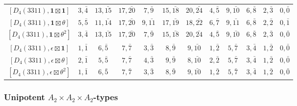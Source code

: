 \begin{table}[ht]
\begin{adjustbox}{max width=\linewidth}
\begin{tabular}{|c|ccccccccccc|}
        $[D_4(3311), \mathbf{1}\boxtimes\mathbf{1}]$ & $3, \bar{4}$ & $13, \bar{15}$ & $17, \bar{20}$ & $7, \bar{9}$ & $15, \bar{18}$ & $20, \bar{24}$ & $4, \bar{5}$ & $9, \bar{10}$ & $6, \bar{8}$ & $2, \bar{3}$ & $0, \bar{0}$ \\ 
        $[D_4(3311), \mathbf{1}\boxtimes\theta]$ & $5, \bar{5}$ & $11, \bar{14}$ & $17, \bar{20}$ & $9, \bar{11}$ & $17, \bar{19}$ & $18, \bar{22}$ & $6, \bar{7}$ & $9, \bar{11}$ & $6, \bar{8}$ & $2, \bar{2}$ & $0, \bar{1}$ \\ 
        $[D_4(3311), \mathbf{1}\boxtimes\theta^2]$ & $3, \bar{4}$ & $13, \bar{15}$ & $17, \bar{20}$ & $7, \bar{9}$ & $15, \bar{18}$ & $20, \bar{24}$ & $4, \bar{5}$ & $9, \bar{10}$ & $6, \bar{8}$ & $2, \bar{3}$ & $0, \bar{0}$ \\ 
        $[D_4(3311), \epsilon\boxtimes\mathbf{1}]$ & $1, \bar{1}$ & $6, \bar{5}$ & $7, \bar{7}$ & $3, \bar{3}$ & $8, \bar{9}$ & $9, \bar{10}$ & $1, \bar{2}$ & $5, \bar{7}$ & $3, \bar{4}$ & $1, \bar{2}$ & $0, \bar{0}$ \\
        $[D_4(3311), \epsilon\boxtimes\theta]$ & $2, \bar{1}$ & $5, \bar{5}$ & $7, \bar{7}$ & $4, \bar{3}$ & $9, \bar{9}$ & $8, \bar{10}$ & $2, \bar{2}$ & $5, \bar{7}$ & $3, \bar{4}$ & $1, \bar{2}$ & $0, \bar{0}$ \\ 
        $[D_4(3311), \epsilon\boxtimes\theta^2]$ & $1, \bar{1}$ & $6, \bar{5}$ & $7, \bar{7}$ & $3, \bar{3}$ & $8, \bar{9}$ & $9, \bar{10}$ & $1, \bar{2}$ & $5, \bar{7}$ & $3, \bar{4}$ & $1, \bar{2}$ & $0, \bar{0}$ \\\hline
        \end{tabular}
        \end{adjustbox}
    \end{table}        



    \newpage

    
    \subsubsection*{Unipotent \texorpdfstring{$A_2\times A_2\times A_2$}{PDFstring}-types}
    
